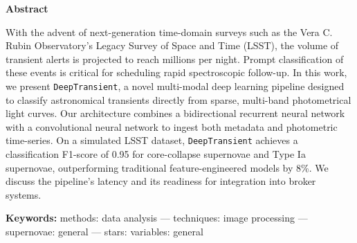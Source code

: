 \documentclass[11pt]{article}
\begin{document}
\maketitle
\thispagestyle{plain} %

\begin{abstractbox}
\noindent\textbf{Abstract}

\smallskip
\noindent With the advent of next-generation time-domain surveys such as the Vera C. Rubin Observatory's Legacy Survey of Space and Time (LSST), the volume of transient alerts is projected to reach millions per night. Prompt classification of these events is critical for scheduling rapid spectroscopic follow-up. In this work, we present \texttt{DeepTransient}, a novel multi-modal deep learning pipeline designed to classify astronomical transients directly from sparse, multi-band photometrical light curves. Our architecture combines a bidirectional recurrent neural network with a convolutional neural network to ingest both metadata and photometric time-series. On a simulated LSST dataset, \texttt{DeepTransient} achieves a classification F1-score of 0.95 for core-collapse supernovae and Type Ia supernovae, outperforming traditional feature-engineered models by 8\%. We discuss the pipeline's latency and its readiness for integration into broker systems.

\medskip
\noindent\textbf{Keywords:} methods: data analysis --- techniques: image processing --- supernovae: general --- stars: variables: general
\end{abstractbox}





\end{document}
